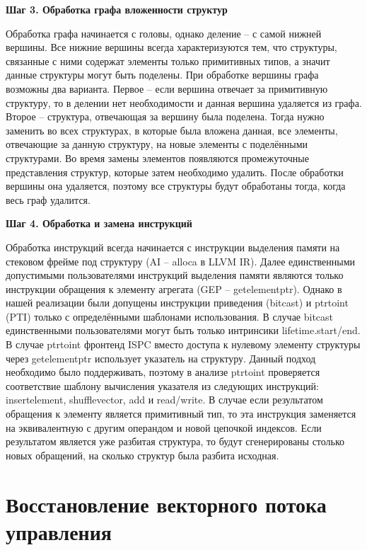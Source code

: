 \textbf{Шаг 3. Обработка графа вложенности структур}

Обработка графа начинается с головы, однако деление -- с самой нижней вершины.
Все нижние вершины всегда характеризуются тем, что структуры, связанные с ними содержат элементы только примитивных типов, а значит данные структуры могут быть поделены.
При обработке вершины графа возможны два варианта.
Первое -- если вершина отвечает за примитивную структуру, то в делении нет необходимости и данная вершина удаляется из графа.
Второе -- структура, отвечающая за вершину была поделена.
Тогда нужно заменить во всех структурах, в которые была вложена данная, все элементы, отвечающие за данную структуру, на новые элементы с поделёнными структурами.
Во время замены элементов появляются промежуточные представления структур, которые затем необходимо удалить.
После обработки вершины она удаляется, поэтому все структуры будут обработаны тогда, когда весь граф удалится.

\textbf{Шаг 4. Обработка и замена инструкций}

Обработка инструкций всегда начинается с инструкции выделения памяти на стековом фрейме под структуру (AI -- alloca в LLVM IR).
Далее единственными допустимыми пользователями инструкций выделения памяти являются только инструкции обращения к элементу агрегата (GEP -- getelementptr).
Однако в нашей реализации были допущены инструкции приведения (bitcast) и ptrtoint (PTI) только с определёнными шаблонами использования.
В случае bitcast единственными пользователями могут быть только интринсики lifetime.start/end.
В случае ptrtoint фронтенд ISPC вместо доступа к нулевому элементу структуры через getelementptr использует указатель на структуру.
Данный подход необходимо было поддерживать, поэтому в анализе ptrtoint проверяется соответствие шаблону вычисления указателя из следующих инструкций: insertelement, shufflevector, add и read/write.
В случае если результатом обращения к элементу является примитивный тип, то эта инструкция заменяется на эквивалентную с другим операндом и новой цепочкой индексов.
Если результатом является уже разбитая структура, то будут сгенерированы столько новых обращений, на сколько структур была разбита исходная.

\section{Восстановление векторного потока управления}\label{sec:lowering/simdcf}

